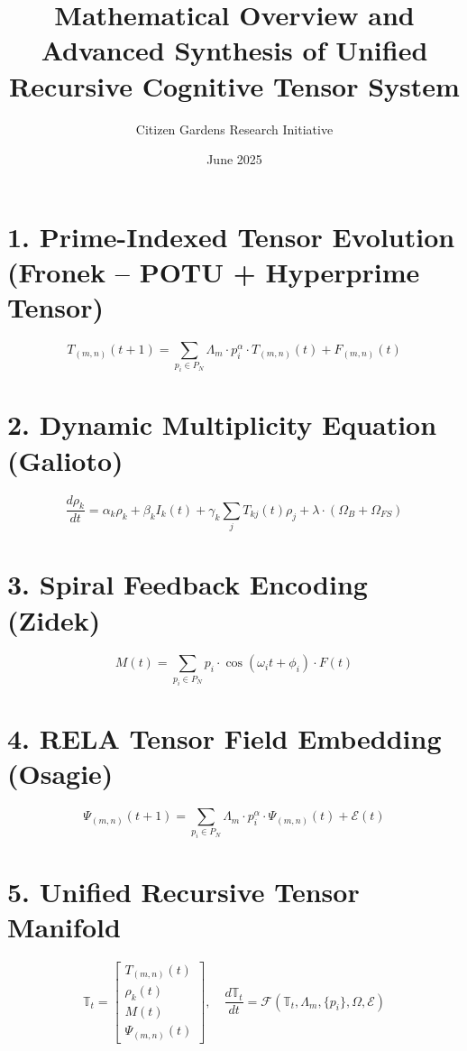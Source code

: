 \documentclass{article}
\title{Mathematical Overview and Advanced Synthesis of Unified Recursive Cognitive Tensor System}
\author{Citizen Gardens Research Initiative}
\date{June 2025}
\begin{document}
\maketitle

\section*{1. Prime-Indexed Tensor Evolution (Fronek – POTU + Hyperprime Tensor)}

\begin{equation}
T_{(m,n)}(t+1) = \sum_{p_i \in P_N} \Lambda_m \cdot p_i^\alpha \cdot T_{(m,n)}(t) + F_{(m,n)}(t)
\end{equation}

\section*{2. Dynamic Multiplicity Equation (Galioto)}

\begin{equation}
\frac{d\rho_k}{dt} = \alpha_k \rho_k + \beta_k I_k(t) + \gamma_k \sum_j T_{kj}(t) \rho_j + \lambda \cdot (\Omega_B + \Omega_{FS})
\end{equation}

\section*{3. Spiral Feedback Encoding (Zidek)}

\begin{equation}
M(t) = \sum_{p_i \in P_N} p_i \cdot \cos(\omega_i t + \phi_i) \cdot F(t)
\end{equation}

\section*{4. RELA Tensor Field Embedding (Osagie)}

\begin{equation}
\Psi_{(m,n)}(t+1) = \sum_{p_i \in P_N} \Lambda_m \cdot p_i^\alpha \cdot \Psi_{(m,n)}(t) + \mathcal{E}(t)
\end{equation}

\section*{5. Unified Recursive Tensor Manifold}

\begin{equation}
\mathbb{T}_t = \begin{bmatrix}
T_{(m,n)}(t) \\
\rho_k(t) \\
M(t) \\
\Psi_{(m,n)}(t)
\end{bmatrix}, \quad
\frac{d\mathbb{T}_t}{dt} = \mathcal{F}(\mathbb{T}_t, \Lambda_m, \{p_i\}, \Omega, \mathcal{E})
\end{equation}
\end{document}
